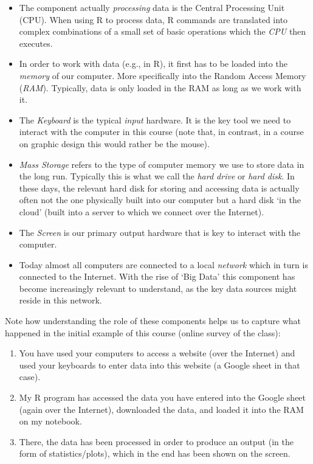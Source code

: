 \documentclass[
  12pt,
]{style/krantz}
\begin{document}
\begin{itemize}
\item
  The component actually \emph{processing} data is the Central Processing Unit (CPU). When using R to process data, R commands are translated into complex combinations of a small set of basic operations which the \emph{CPU} then executes.
\item
  In order to work with data (e.g., in R), it first has to be loaded into the \emph{memory} of our computer. More specifically into the Random Access Memory (\emph{RAM}). Typically, data is only loaded in the RAM as long as we work with it.
\item
  The \emph{Keyboard} is the typical \emph{input} hardware. It is the key tool we need to interact with the computer in this course (note that, in contrast, in a course on graphic design this would rather be the mouse).
\item
  \emph{Mass Storage} refers to the type of computer memory we use to store data in the long run. Typically this is what we call the \emph{hard drive} or \emph{hard disk}. In these days, the relevant hard disk for storing and accessing data is actually often not the one physically built into our computer but a hard disk `in the cloud' (built into a server to which we connect over the Internet).
\item
  The \emph{Screen} is our primary output hardware that is key to interact with the computer.
\item
  Today almost all computers are connected to a local \emph{network} which in turn is connected to the Internet. With the rise of `Big Data' this component has become increasingly relevant to understand, as the key data sources might reside in this network.
\end{itemize}

Note how understanding the role of these components helps us to capture what happened in the initial example of this course (online survey of the class):

\begin{enumerate}
\def\labelenumi{\arabic{enumi}.}
\item
  You have used your computers to access a website (over the Internet) and used your keyboards to enter data into this website (a Google sheet in that case).
\item
  My R program has accessed the data you have entered into the Google sheet (again over the Internet), downloaded the data, and loaded it into the RAM on my notebook.
\item
  There, the data has been processed in order to produce an output (in the form of statistics/plots), which in the end has been shown on the screen.
\end{enumerate}
\end{document}
